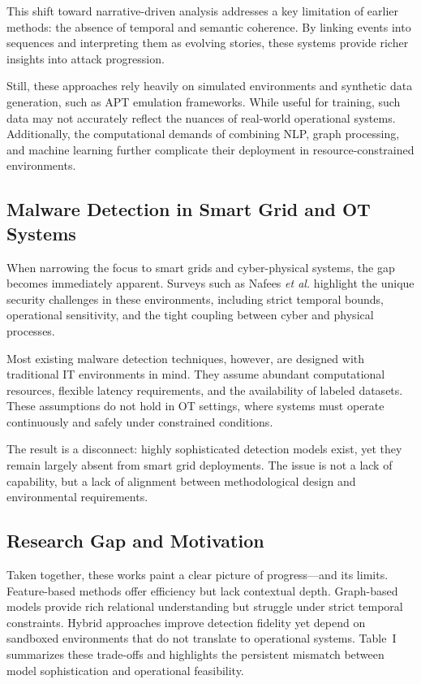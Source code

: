 \documentclass[conference]{IEEEtran}
\begin{document}
This shift toward narrative-driven analysis addresses a key limitation of earlier methods: the absence of temporal and semantic coherence. By linking events into sequences and interpreting them as evolving stories, these systems provide richer insights into attack progression.

Still, these approaches rely heavily on simulated environments and synthetic data generation, such as APT emulation frameworks. While useful for training, such data may not accurately reflect the nuances of real-world operational systems. Additionally, the computational demands of combining NLP, graph processing, and machine learning further complicate their deployment in resource-constrained environments.

\subsection{Malware Detection in Smart Grid and OT Systems}

When narrowing the focus to smart grids and cyber-physical systems, the gap becomes immediately apparent. Surveys such as Nafees \textit{et al.} \cite{nafees2023} highlight the unique security challenges in these environments, including strict temporal bounds, operational sensitivity, and the tight coupling between cyber and physical processes.

Most existing malware detection techniques, however, are designed with traditional IT environments in mind. They assume abundant computational resources, flexible latency requirements, and the availability of labeled datasets. These assumptions do not hold in OT settings, where systems must operate continuously and safely under constrained conditions.

The result is a disconnect: highly sophisticated detection models exist, yet they remain largely absent from smart grid deployments. The issue is not a lack of capability, but a lack of alignment between methodological design and environmental requirements.



\subsection{Research Gap and Motivation}

Taken together, these works paint a clear picture of progress—and its limits. Feature-based methods offer efficiency but lack contextual depth. Graph-based models provide rich relational understanding but struggle under strict temporal constraints. Hybrid approaches improve detection fidelity yet depend on sandboxed environments that do not translate to operational systems. Table~I summarizes these trade-offs and highlights the persistent mismatch between model sophistication and operational feasibility.
\end{document}
